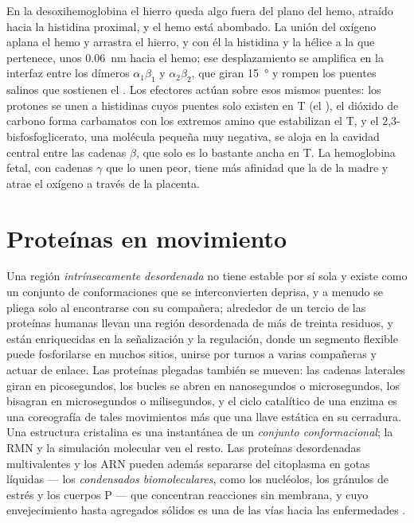 \begin{proposition}\label{prop:b3:structural-biology:mechanism}
En la desoxihemoglobina el hierro queda algo fuera del plano del hemo,
atraído hacia la histidina proximal, y el hemo está abombado. La unión
del oxígeno aplana el hemo y arrastra el hierro, y con él la histidina y
la hélice a la que pertenece, unos \qty{0.06}{nm} hacia el hemo; ese
desplazamiento se amplifica en la interfaz entre los dímeros
$\alpha_{1}\beta_{1}$ y $\alpha_{2}\beta_{2}$, que giran
\qty{15}{\degree} y rompen los puentes salinos que sostienen el .
Los efectores actúan sobre esos mismos puentes: los protones se unen a
histidinas cuyos puentes solo existen en T (el ), el dióxido
de carbono forma carbamatos con los extremos amino que estabilizan el T,
y el 2,3-bisfosfoglicerato, una molécula pequeña muy negativa, se aloja
en la cavidad central entre las cadenas $\beta$, que solo es lo bastante
ancha en T. La hemoglobina fetal, con cadenas $\gamma$ que lo unen peor,
tiene más afinidad que la de la madre y atrae el oxígeno a través de la
placenta.
\end{proposition}

\section{Proteínas en movimiento}

\begin{definition}\label{def:b3:structural-biology:disorder}
Una región \emph{intrínsecamente desordenada} no tiene 
estable por sí sola y existe como un conjunto de conformaciones que se
interconvierten deprisa, y a menudo se pliega solo al encontrarse con su
compañera; alrededor de un tercio de las proteínas humanas llevan una
región desordenada de más de treinta residuos, y están enriquecidas en la
señalización y la regulación, donde un segmento flexible puede
fosforilarse en muchos sitios, unirse por turnos a varias compañeras y
actuar de enlace. Las proteínas plegadas también se mueven: las cadenas
laterales giran en picosegundos, los bucles se abren en nanosegundos o
microsegundos, los  bisagran en microsegundos o milisegundos, y
el ciclo catalítico de una enzima es una coreografía de tales movimientos
más que una llave estática en su cerradura. Una estructura cristalina es
una instantánea de un \emph{conjunto conformacional}; la RMN y la
simulación molecular ven el resto. Las proteínas desordenadas
multivalentes y los ARN pueden además separarse del citoplasma en gotas
líquidas --- los \emph{condensados biomoleculares}, como los nucléolos,
los gránulos de estrés y los cuerpos P --- que concentran reacciones sin
membrana, y cuyo envejecimiento hasta agregados sólidos es una de las
vías hacia las enfermedades .
\end{definition}

